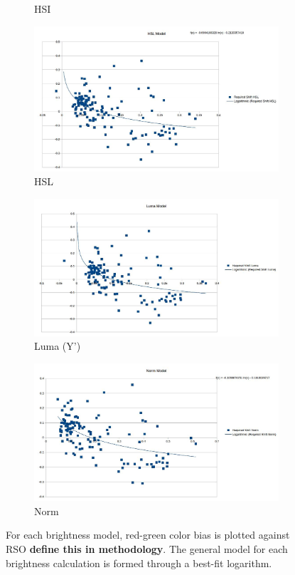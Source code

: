 \documentclass[12pt]{report}
\begin{document}
\begin{figure}
\begin{subfigure}{.49\linewidth}
  \caption{HSI}
\end{subfigure}
\hfill
\begin{subfigure}{.49\linewidth}
  \includegraphics[width=1\linewidth]{figures/model/scatter/model_hsl.jpg}
  \caption{HSL}
\end{subfigure}
\hfill
\begin{subfigure}{.49\linewidth}
  \includegraphics[width=1\linewidth]{figures/model/scatter/model_luma.jpg}
  \caption{Luma (Y')}
\end{subfigure}
\hfill
\begin{subfigure}{.49\linewidth}
  \includegraphics[width=1\linewidth]{figures/model/scatter/model_norm.jpg}
  \caption{Norm}
\end{subfigure}

\caption{For each brightness model, red-green color bias is plotted against RSO \textbf{define this in methodology}. The general model for each brightness calculation is formed through a best-fit logarithm.}
\label{fig:model_scatter}
\end{figure}
\end{document}
